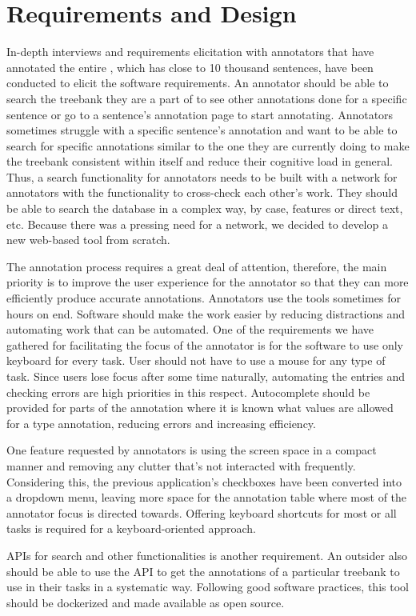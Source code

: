 \section{Requirements and Design}
\label{sec:requirements}

In-depth interviews and requirements elicitation with annotators that have annotated the entire \bountreebank{}, which has close to 10 thousand sentences, have been conducted to elicit the software requirements.
An annotator should be able to search the treebank they are a part of to see other annotations done for a specific sentence or go to a sentence's annotation page to start annotating.
Annotators sometimes struggle with a specific sentence's annotation and want to be able to search for specific annotations similar to the one they are currently doing to make the treebank consistent within itself and reduce their cognitive load in general.
Thus, a search functionality for annotators needs to be built with a network for annotators with the functionality to cross-check each other's work.
They should be able to search the database in a complex way, by case, features or direct text, etc.
Because there was a pressing need for a network, we decided to develop a new web-based tool from scratch.

The annotation process requires a great deal of attention, therefore, the main priority is to improve the user experience for the annotator so that they can more efficiently produce accurate annotations.
Annotators use the tools sometimes for hours on end.
Software should make the work easier by reducing distractions and automating work that can be automated.
One of the requirements we have gathered for facilitating the focus of the annotator is for the software to use only keyboard for every task.
User should not have to use a mouse for any type of task.
Since users lose focus after some time naturally, automating the entries and checking errors are high priorities in this respect.
Autocomplete should be provided for parts of the annotation where it is known what values are allowed for a \conllu{} type annotation, reducing errors and increasing efficiency.

One feature requested by annotators is using the screen space in a compact manner and removing any clutter that's not interacted with frequently.
Considering this, the previous application's checkboxes have been converted into a dropdown menu, leaving more space for the annotation table where most of the annotator focus is directed towards.
Offering keyboard shortcuts for most or all tasks is required for a keyboard-oriented approach.

APIs for search and other functionalities is another requirement.
An outsider also should be able to use the API to get the annotations of a particular treebank to use in their tasks in a systematic way.
Following good software practices, this tool should be dockerized and made available as open source.
